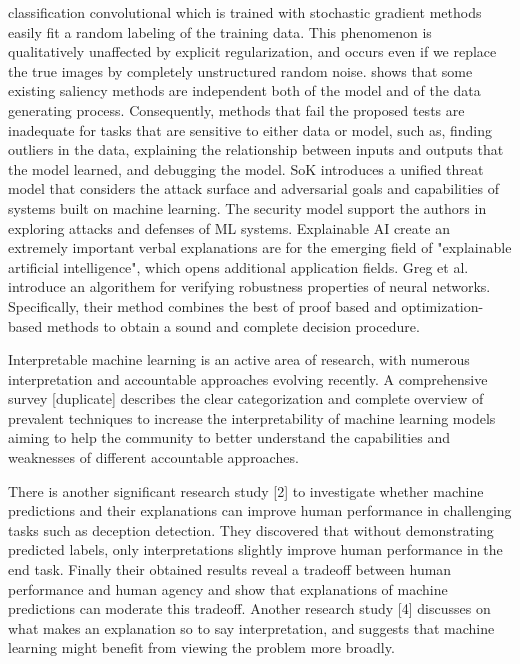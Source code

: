 classification convolutional which is trained with stochastic gradient methods easily fit a random labeling of the training data. This phenomenon is qualitatively unaffected by explicit regularization, and occurs even if we replace the true images by completely unstructured random noise. \cite{adebayo2018sanity} shows that some existing saliency methods are independent both of the model and of the data generating process. Consequently, methods that fail the proposed tests are inadequate for tasks that are sensitive to either data or model, such as, finding outliers in the data, explaining the relationship between inputs and outputs that the model learned, and debugging the model. SoK \cite{papernot2016towards} introduces a unified threat model that considers the attack surface and adversarial goals and capabilities of systems built on machine learning. The security model support the authors in exploring attacks and defenses of ML systems. Explainable AI \cite{goebel2018explainable} create an extremely important verbal explanations are  for the emerging field of "explainable artificial intelligence", which opens additional application fields. Greg et al. \cite{anderson2019optimization} introduce an algorithem for verifying robustness properties of neural networks. Specifically, their method combines the best of proof based and optimization-based methods to obtain a sound and complete decision procedure. 

Interpretable machine learning is an active area of research, with  numerous interpretation and accountable approaches evolving recently. A comprehensive survey [duplicate] describes the clear categorization and complete overview of prevalent techniques to increase the interpretability of machine learning models aiming to help the community to better understand the capabilities and weaknesses of different accountable approaches.

There is another significant research study [2] to investigate whether machine predictions and their explanations can improve human performance in challenging tasks such as deception detection. They discovered that without demonstrating predicted labels, only interpretations  slightly improve human performance in the end task. Finally their obtained results reveal a tradeoff between human performance and human agency and show that explanations of machine predictions can moderate this tradeoff. Another research study [4] discusses on what makes an explanation so to say interpretation, and suggests that machine learning might benefit from viewing the problem more broadly.
